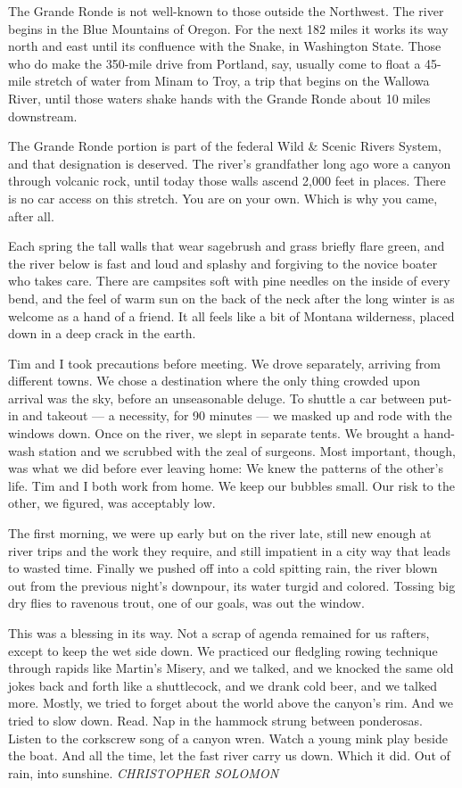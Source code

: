 The Grande Ronde is not well-known to those outside the Northwest. The
river begins in the Blue Mountains of Oregon. For the next 182 miles it
works its way north and east until its confluence with the Snake, in
Washington State. Those who do make the 350-mile drive from Portland,
say, usually come to float a 45-mile stretch of water from Minam to
Troy, a trip that begins on the Wallowa River, until those waters shake
hands with the Grande Ronde about 10 miles downstream.

The Grande Ronde portion is part of the federal Wild \& Scenic Rivers
System, and that designation is deserved. The river's grandfather long
ago wore a canyon through volcanic rock, until today those walls ascend
2,000 feet in places. There is no car access on this stretch. You are on
your own. Which is why you came, after all.

Each spring the tall walls that wear sagebrush and grass briefly flare
green, and the river below is fast and loud and splashy and forgiving to
the novice boater who takes care. There are campsites soft with pine
needles on the inside of every bend, and the feel of warm sun on the
back of the neck after the long winter is as welcome as a hand of a
friend. It all feels like a bit of Montana wilderness, placed down in a
deep crack in the earth.

Tim and I took precautions before meeting. We drove separately, arriving
from different towns. We chose a destination where the only thing
crowded upon arrival was the sky, before an unseasonable deluge. To
shuttle a car between put-in and takeout --- a necessity, for 90 minutes
--- we masked up and rode with the windows down. Once on the river, we
slept in separate tents. We brought a hand-wash station and we scrubbed
with the zeal of surgeons. Most important, though, was what we did
before ever leaving home: We knew the patterns of the other's life. Tim
and I both work from home. We keep our bubbles small. Our risk to the
other, we figured, was acceptably low.

The first morning, we were up early but on the river late, still new
enough at river trips and the work they require, and still impatient in
a city way that leads to wasted time. Finally we pushed off into a cold
spitting rain, the river blown out from the previous night's downpour,
its water turgid and colored. Tossing big dry flies to ravenous trout,
one of our goals, was out the window.

This was a blessing in its way. Not a scrap of agenda remained for us
rafters, except to keep the wet side down. We practiced our fledgling
rowing technique through rapids like Martin's Misery, and we talked, and
we knocked the same old jokes back and forth like a shuttlecock, and we
drank cold beer, and we talked more. Mostly, we tried to forget about
the world above the canyon's rim. And we tried to slow down. Read. Nap
in the hammock strung between ponderosas. Listen to the corkscrew song
of a canyon wren. Watch a young mink play beside the boat. And all the
time, let the fast river carry us down. Which it did. Out of rain, into
sunshine. \emph{CHRISTOPHER SOLOMON}

